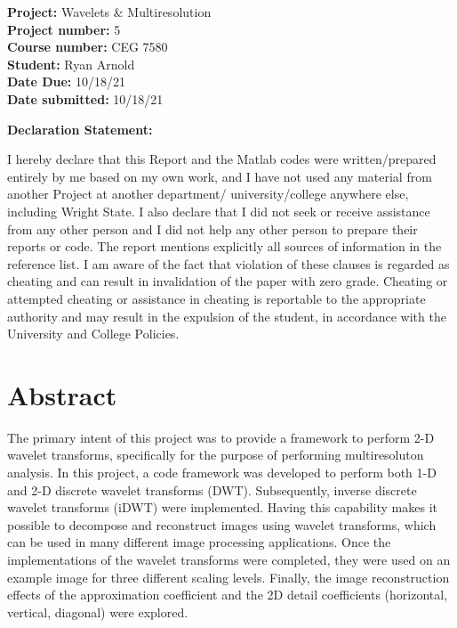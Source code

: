 \documentclass[./rarnold_report5.tex]{subfiles}
\begin{document}


\begin{titlepage}

\noindent
\textbf{Project:} Wavelets \& Multiresolution \\
\textbf{Project number:} 5\\
\textbf{Course number:} CEG 7580\\
\textbf{Student:} Ryan Arnold \\
\textbf{Date Due:} 10/18/21 \\
\textbf{Date submitted:} 10/18/21
\vspace{24pt}

\noindent \textbf{Declaration Statement: }

\noindent I hereby declare that this Report and the Matlab codes were written/prepared entirely by me based on my own work, and I have not used any material from another Project at another department/ university/college anywhere else, including Wright State. I also declare that I did not seek or receive assistance from any other person and I did not help any other person to prepare their reports or code.  The report mentions explicitly all sources of information in the reference list. I am aware of the fact that violation of these clauses is regarded as cheating and can result in invalidation of the paper with zero grade. Cheating or attempted cheating or assistance in cheating is reportable to the appropriate authority and may result in the expulsion of the student, in accordance with the University and College Policies.

\end{titlepage}

\clearpage
\section*{Abstract}

\noindent The primary intent of this project was to provide a framework to perform 2-D wavelet transforms, specifically for the purpose of performing multiresoluton analysis.  In this project, a code framework was developed to perform both 1-D and 2-D discrete wavelet transforms (DWT).  Subsequently, inverse discrete wavelet transforms (iDWT) were implemented.  Having this capability makes it possible to decompose and reconstruct images using wavelet transforms, which can be used in many different image processing applications.  Once the implementations of the wavelet transforms were completed, they were used on an example image for three different scaling levels.  Finally, the image reconstruction effects of the approximation coefficient and the 2D detail coefficients (horizontal, vertical, diagonal) were  explored.
\end{document}
